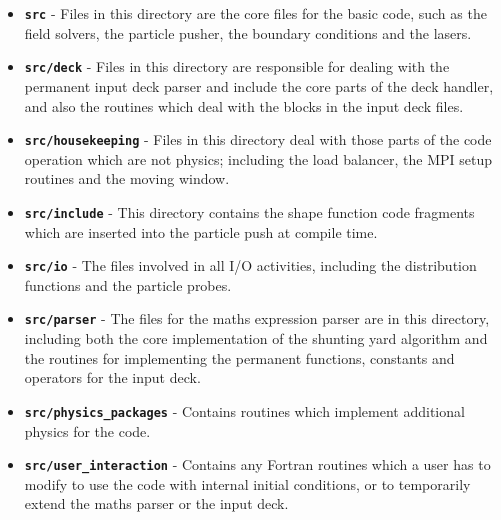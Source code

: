 \documentclass[12pt,a4paper]{article}
\newcommand{\inlinecode}[1]{{\color{warwickred} \bf\texttt{#1}}}
\newcommand{\EPOCH}{{\color{warwickdark}\fontfamily{phv}\selectfont{EPOCH}}}
\begin{document}
\begin{itemize}
\item \inlinecode{src} - Files in this directory are the core files for the
  basic {\EPOCH} code, such as the field solvers, the particle pusher, the
  boundary conditions and the lasers.
\item \inlinecode{src/deck} - Files in this directory are responsible for
  dealing with the permanent input deck parser and include the core parts of
  the deck handler, and also the routines which deal with the blocks in the
  input deck files.
\item \inlinecode{src/housekeeping} - Files in this directory deal with those
  parts of the code operation which are not physics; including the load
  balancer, the MPI setup routines and the moving window.
\item \inlinecode{src/include} - This directory contains the shape function
  code fragments which are inserted into the particle push at compile time.
\item \inlinecode{src/io} - The files involved in all I/O activities, including
  the distribution functions and the particle probes.
\item \inlinecode{src/parser} - The files for the maths expression parser are
  in this directory, including both the core implementation of the shunting yard
  algorithm and the routines for implementing the permanent functions,
  constants and operators for the input deck.
\item \inlinecode{src/physics\_packages} - Contains routines which implement
  additional physics for the code.
\item \inlinecode{src/user\_interaction} - Contains any Fortran routines which
  a user has to modify to use the code with internal initial conditions, or to
  temporarily extend the maths parser or the input deck.
\end{itemize}
\end{document}

